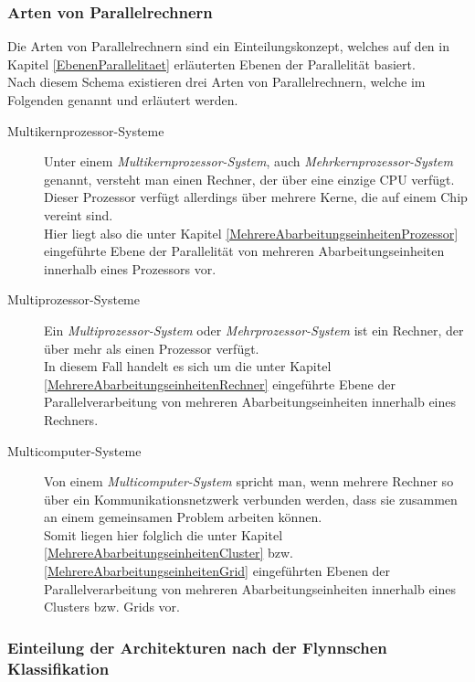 			\subsubsection{Arten von Parallelrechnern}
				
				Die Arten von Parallelrechnern sind ein Einteilungskonzept, welches auf den in Kapitel \ref{EbenenParallelitaet} erläuterten Ebenen der Parallelität basiert.\\
				Nach diesem Schema existieren drei Arten von Parallelrechnern, welche im Folgenden genannt und erläutert werden. \cite{BSMultiprozessorsysteme}
				
				\begin{description}
					\item [Multikernprozessor-Systeme]
						Unter einem \textit{Multikernprozessor-System}, auch \textit{Mehrkernprozessor-System} genannt, versteht man einen Rechner, der über eine einzige CPU verfügt. Dieser Prozessor verfügt allerdings über mehrere Kerne, die auf einem Chip vereint sind. \cite{MehrkernprozessorWikipedia}\\
						Hier liegt also die unter Kapitel \ref{MehrereAbarbeitungseinheitenProzessor} eingeführte Ebene der Parallelität von mehreren Abarbeitungseinheiten innerhalb eines Prozessors vor.
					
					\item [Multiprozessor-Systeme]
						Ein \textit{Multiprozessor-System} oder \textit{Mehrprozessor-System} ist ein Rechner, der über mehr als einen Prozessor verfügt. \cite{MehrprozessorsystemWikipedia}\\
						In diesem Fall handelt es sich um die unter Kapitel \ref{MehrereAbarbeitungseinheitenRechner} eingeführte Ebene der Parallelverarbeitung von mehreren Abarbeitungseinheiten innerhalb eines Rechners.
					
					\item [Multicomputer-Systeme]
						Von einem \textit{Multicomputer-System} spricht man, wenn mehrere Rechner so über ein Kommunikationsnetzwerk verbunden werden, dass sie zusammen an einem gemeinsamen Problem arbeiten können. \cite{MulticomputerIGI}\\
						Somit liegen hier folglich die unter Kapitel \ref{MehrereAbarbeitungseinheitenCluster} bzw. \ref{MehrereAbarbeitungseinheitenGrid} eingeführten Ebenen der Parallelverarbeitung von mehreren Abarbeitungseinheiten innerhalb eines Clusters bzw. Grids vor.
				\end{description}
				
			\subsubsection{Einteilung der Architekturen nach der Flynnschen Klassifikation}
				

